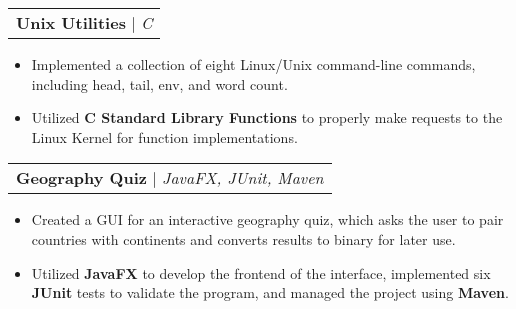 \documentclass[letterpaper,11pt]{article}
\makeatletter
\newcommand{\resumeProjectHeading}[2]{
    \begin{tabular*}{0.97\textwidth}[t]{l@{\extracolsep{\fill}}}
      \textbf{#1} $\vert$ \textit{#2} 
    \end{tabular*}\vspace{-4pt}
}
\newcommand{\resumeItemListStart}{\begin{itemize}[noitemsep]\vspace{-4pt}}
\newcommand{\resumeItemListEnd}{\end{itemize}}
\makeatother
\begin{document}
    \resumeProjectHeading{Unix Utilities}{C}
      \resumeItemListStart
        \item {Implemented a collection of eight Linux/Unix command-line commands, including head, tail, env, and word count.}
        \item {Utilized \textbf{C Standard Library Functions} to properly make requests to the Linux Kernel for function implementations.}
      \resumeItemListEnd

    \resumeProjectHeading{Geography Quiz}{JavaFX, JUnit, Maven}
      \resumeItemListStart
        \item {Created a GUI for an interactive geography quiz, which asks the user to pair countries with continents and converts results to binary for later use.}
        \item {Utilized \textbf{JavaFX} to develop the frontend of the interface, implemented six \textbf{JUnit} tests to validate the program, and managed the project using \textbf{Maven}.}
      \resumeItemListEnd
\end{document}
